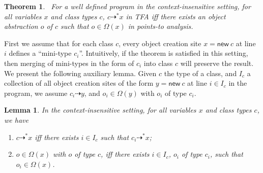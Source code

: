 \documentclass{fac}
\newcommand\ie{\textit{i.e.\ }}
\newtheorem{Theorem}{Theorem}
\newtheorem{Lemma}{Lemma}
\newcommand{\keyword}[1]{\mathsf{#1}}
\newcommand{\kwnew}[0]{\keyword{new}}
\newcommand{\VPT}{\Omega}
\newcommand{\tflow}{\dashrightarrow}
\begin{document}
\begin{Theorem}~\label{thm:tfa}
For a well defined program in the context-insensitive setting, for all variables $x$ and class types $c$, $c\tflow^*x$ in TFA iff there exists an object abstraction $o$ of $c$ such that $o\in\VPT(x)$ in points-to analysis.
\end{Theorem}

First we assume that for each class $c$, every object creation site $x = \kwnew\ c$ at line $i$ defines a ``mini-type $c_i$''. Intuitively, if the theorem is satisfied in this setting, then merging of mini-types in the form of $c_i$ into class $c$ will preserve the result. We present the following auxiliary lemma. Given $c$ the type of a class, and $I_c$ a collection of all object creation sites of the form $y = \kwnew\ c$ at line $i\in I_c$ in the program, we assume $c_i\tflow y$, and $o_i\in\VPT(y)$ with $o_i$ of type $c_i$.

\begin{Lemma}\label{lem:mini-type}
In the context-insensitive setting, for all variables $x$ and class types $c$, we have \begin{enumerate}
\item $c\tflow^* x$ iff there exists $i\in I_c$ such that $c_i\tflow^* x$;
\item $o\in\VPT(x)$ with $o$ of type $c$, iff there exists $i\in I_c$, $o_i$ of type $c_i$, such that $o_i\in\VPT(x)$.
\end{enumerate}
\end{Lemma}


\end{document}
